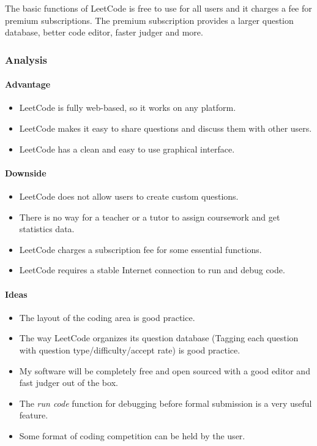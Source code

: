 \documentclass[a4paper]{report}
\begin{document}
The basic functions of LeetCode is free to use for all users and it charges a fee for premium subscriptions. The premium subscription provides a larger question database, better code editor, faster judger and more.

\subsubsection{Analysis}

\paragraph{Advantage}

\begin{itemize}
    \item LeetCode is fully web-based, so it works on any platform.
    \item LeetCode makes it easy to share questions and discuss them with other users.
    \item LeetCode has a clean and easy to use graphical interface.
\end{itemize}

\paragraph{Downside}

\begin{itemize}
    \item LeetCode does not allow users to create custom questions.
    \item There is no way for a teacher or a tutor to assign coursework and get statistics data.
    \item LeetCode charges a subscription fee for some essential functions.
    \item LeetCode requires a stable Internet connection to run and debug code.
\end{itemize}

\paragraph{Ideas}

\begin{itemize}
    \item The layout of the coding area is good practice.
    \item The way LeetCode organizes its question database (Tagging each question with question type/difficulty/accept rate) is good practice.
    \item My software will be completely free and open sourced with a good editor and fast judger out of the box.
    \item The \emph{run code} function for debugging before formal submission is a very useful feature.
    \item Some format of coding competition can be held by the user.
\end{itemize}
\end{document}
